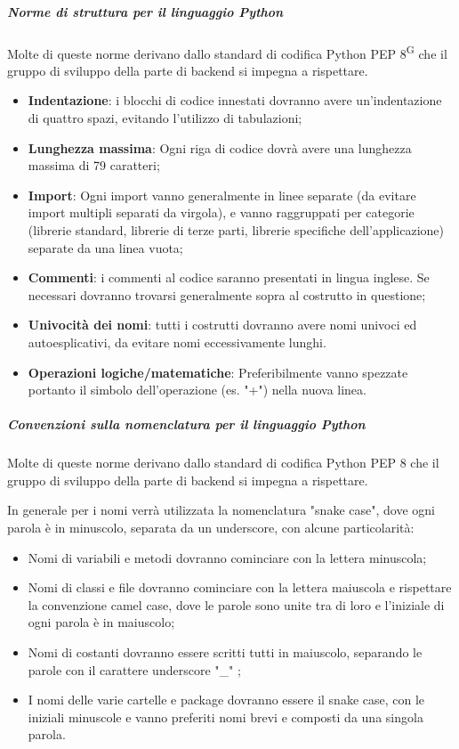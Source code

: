 \subparagraph{Norme di struttura per il linguaggio Python}
Molte di queste norme derivano dallo standard di codifica Python PEP 8\textsuperscript{G} che il gruppo di sviluppo della parte di backend si impegna a rispettare.
\begin{itemize}
\item \textbf{Indentazione}: i blocchi di codice innestati dovranno avere un’indentazione di quattro spazi, evitando l'utilizzo di tabulazioni;
\item \textbf{Lunghezza massima}: Ogni riga di codice dovrà avere una lunghezza massima di 79 caratteri; 
\item \textbf{Import}: Ogni import vanno generalmente in linee separate (da evitare import multipli separati da virgola), e vanno raggruppati per categorie (librerie standard, librerie di terze parti, librerie specifiche dell'applicazione) separate da una linea vuota;
\item \textbf{Commenti}: i commenti al codice saranno presentati in lingua inglese. Se necessari dovranno trovarsi generalmente sopra al costrutto in questione;
\item  \textbf{Univocità dei nomi}: tutti i costrutti dovranno avere nomi univoci ed autoesplicativi, da evitare nomi eccessivamente lunghi.
\item \textbf{Operazioni logiche/matematiche}: Preferibilmente vanno spezzate portanto il simbolo dell'operazione (es. "+") nella nuova linea.
\end{itemize}

\subparagraph{Convenzioni sulla nomenclatura per il linguaggio Python}
Molte di queste norme derivano dallo standard di codifica Python PEP 8 che il gruppo di sviluppo della parte di backend si impegna a rispettare.

In generale per i nomi verrà utilizzata la nomenclatura "snake case", dove ogni parola è in minuscolo, separata da un underscore, con alcune particolarità:
\begin{itemize}
\item Nomi di variabili e metodi dovranno cominciare con la lettera minuscola;
\item Nomi di classi e file dovranno cominciare con la lettera maiuscola e rispettare la convenzione camel case, dove le parole sono unite tra di loro e l'iniziale di ogni parola è in maiuscolo;
\item Nomi di costanti dovranno essere scritti tutti in maiuscolo, separando le parole con il carattere underscore "\_" ;
\item I nomi delle varie cartelle e package dovranno essere il snake case, con le iniziali minuscole e vanno preferiti nomi brevi e composti da una singola parola.
\end{itemize}

